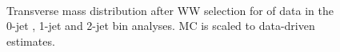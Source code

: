 \begin{figure}[!hbtp]
\centering
{}
 \\
\caption{Transverse mass distribution after WW selection for \intlumiEightTeV of data in the 0-jet , 
1-jet  and 2-jet  bin analyses. 
MC is scaled to data-driven estimates.}
\label{fig:ww_mt}
\end{figure}

